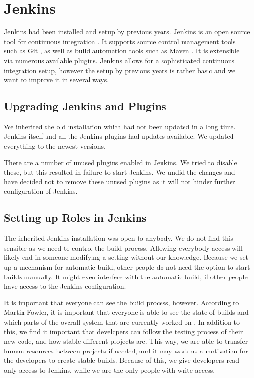 \section{Jenkins}\label{sec:jenkins}
Jenkins had been installed and setup by previous years. Jenkins is an open source tool for continuous integration \parencite{JenkinsWebsite}. It supports source control management tools such as Git \parencite{gitwebsite}, as well as build automation tools such as Maven \parencite{mavenwebsite}. It is extensible via numerous available plugins. Jenkins allows for a sophisticated continuous integration setup, however the setup by previous years is rather basic and we want to improve it in several ways.

\subsection{Upgrading Jenkins and Plugins}
We inherited the old installation which had not been updated in a long time. Jenkins itself and all the Jenkins plugins had updates available. We updated everything to the newest versions.

There are a number of unused plugins enabled in Jenkins. We tried to disable these, but this resulted in failure to start Jenkins. We undid the changes and have decided not to remove these unused plugins as it will not hinder further configuration of Jenkins.

\subsection{Setting up Roles in Jenkins}
The inherited Jenkins installation was open to anybody. We do not find this sensible as we need to control the build process. Allowing everybody access will likely end in someone modifying a setting without our knowledge. Because we set up a mechanism for automatic build, other people do not need the option to start builds manually. It might even interfere with the automatic build, if other people have access to the Jenkins configuration.

It is important that everyone can see the build process, however. According to Martin Fowler, it is important that everyone is able to see the state of builds and which parts of the overall system that are currently worked on \parencite{fowlerCI}. In addition to this, we find it important that developers can follow the testing process of their new code, and how stable different projects are. This way, we are able to transfer human resources between projects if needed, and it may work as a motivation for the developers to create stable builds. Because of this, we give developers read-only access to Jenkins, while we are the only people with write access.


